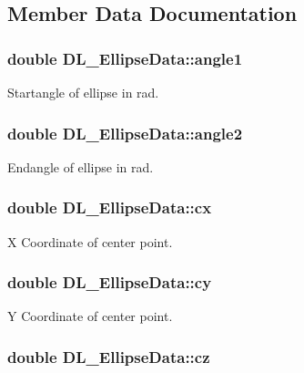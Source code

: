 \subsection{Member Data Documentation}
\hypertarget{structDL__EllipseData_a3684abdf6b8bf47116e16005df64f0a0}{
\subsubsection[{angle1}]{\setlength{\rightskip}{0pt plus 5cm}double D\-L\-\_\-\-Ellipse\-Data\-::angle1}}\label{structDL__EllipseData_a3684abdf6b8bf47116e16005df64f0a0}
Startangle of ellipse in rad. \hypertarget{structDL__EllipseData_aeb8df00561139f72101017650477ed0d}{
\subsubsection[{angle2}]{\setlength{\rightskip}{0pt plus 5cm}double D\-L\-\_\-\-Ellipse\-Data\-::angle2}}\label{structDL__EllipseData_aeb8df00561139f72101017650477ed0d}
Endangle of ellipse in rad. \hypertarget{structDL__EllipseData_a284a7366884274a17706c49be09f8a46}{
\subsubsection[{cx}]{\setlength{\rightskip}{0pt plus 5cm}double D\-L\-\_\-\-Ellipse\-Data\-::cx}}\label{structDL__EllipseData_a284a7366884274a17706c49be09f8a46}
X Coordinate of center point. \hypertarget{structDL__EllipseData_aadb924e5422dd6b32ab4ab4077c8b118}{
\subsubsection[{cy}]{\setlength{\rightskip}{0pt plus 5cm}double D\-L\-\_\-\-Ellipse\-Data\-::cy}}\label{structDL__EllipseData_aadb924e5422dd6b32ab4ab4077c8b118}
Y Coordinate of center point. \hypertarget{structDL__EllipseData_ae3208ae1257d71f2475132509a3fb253}{
\subsubsection[{cz}]{\setlength{\rightskip}{0pt plus 5cm}double D\-L\-\_\-\-Ellipse\-Data\-::cz}}\label{structDL__EllipseData_ae3208ae1257d71f2475132509a3fb253}
